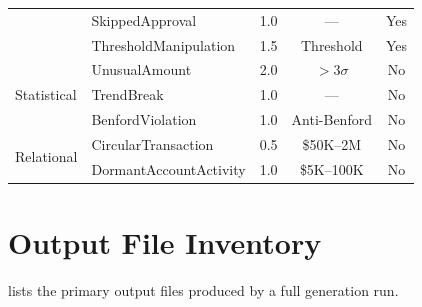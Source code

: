 \begin{table}[H]
\begin{tabular}{llccc}
  & SkippedApproval              & 1.0 & ---         & Yes \\
  & ThresholdManipulation        & 1.5 & Threshold   & Yes \\
\midrule
\multirow{3}{*}{Statistical}
  & UnusualAmount                & 2.0 & $>3\sigma$  & No \\
  & TrendBreak                   & 1.0 & ---         & No \\
  & BenfordViolation             & 1.0 & Anti-Benford & No \\
\midrule
\multirow{2}{*}{Relational}
  & CircularTransaction          & 0.5 & \$50K--2M   & No \\
  & DormantAccountActivity       & 1.0 & \$5K--100K  & No \\
\bottomrule
\end{tabular}
\end{table}

\section{Output File Inventory}
\label{app:output_files}

 lists the primary output files produced by
a full \system{} generation run.

